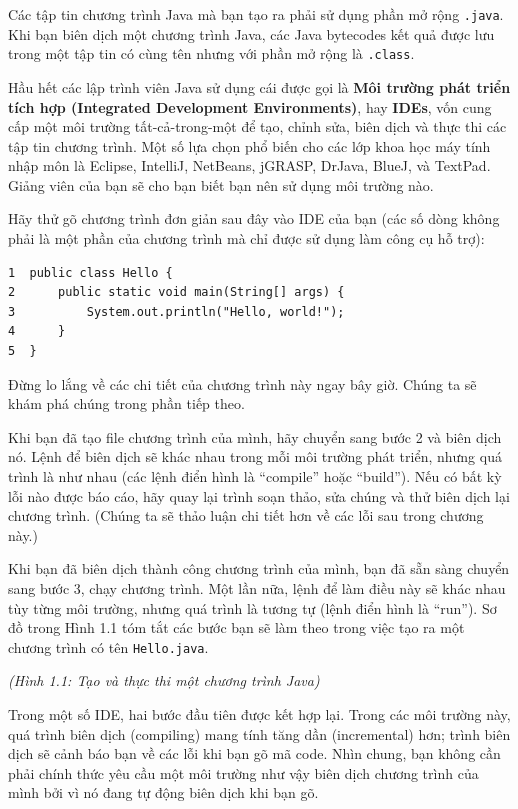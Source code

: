 Các tập tin chương trình Java mà bạn tạo ra phải sử dụng phần mở rộng
\texttt{.java}. Khi bạn biên dịch một chương trình Java, các Java
bytecodes kết quả được lưu trong một tập tin có cùng tên nhưng với phần
mở rộng là \texttt{.class}.

Hầu hết các lập trình viên Java sử dụng cái được gọi là \textbf{Môi
trường phát triển tích hợp (Integrated Development Environments)}, hay
\textbf{IDEs}, vốn cung cấp một môi trường tất-cả-trong-một để tạo,
chỉnh sửa, biên dịch và thực thi các tập tin chương trình. Một số lựa
chọn phổ biến cho các lớp khoa học máy tính nhập môn là Eclipse,
IntelliJ, NetBeans, jGRASP, DrJava, BlueJ, và TextPad. Giảng viên của
bạn sẽ cho bạn biết bạn nên sử dụng môi trường nào.

Hãy thử gõ chương trình đơn giản sau đây vào IDE của bạn (các số dòng
không phải là một phần của chương trình mà chỉ được sử dụng làm công cụ
hỗ trợ):

\begin{verbatim}
1  public class Hello {
2      public static void main(String[] args) {
3          System.out.println("Hello, world!");
4      }
5  }
\end{verbatim}

Đừng lo lắng về các chi tiết của chương trình này ngay bây giờ. Chúng ta
sẽ khám phá chúng trong phần tiếp theo.

Khi bạn đã tạo file chương trình của mình, hãy chuyển sang bước 2 và
biên dịch nó. Lệnh để biên dịch sẽ khác nhau trong mỗi môi trường phát
triển, nhưng quá trình là như nhau (các lệnh điển hình là ``compile''
hoặc ``build''). Nếu có bất kỳ lỗi nào được báo cáo, hãy quay lại trình
soạn thảo, sửa chúng và thử biên dịch lại chương trình. (Chúng ta sẽ
thảo luận chi tiết hơn về các lỗi sau trong chương này.)

Khi bạn đã biên dịch thành công chương trình của mình, bạn đã sẵn sàng
chuyển sang bước 3, chạy chương trình. Một lần nữa, lệnh để làm điều này
sẽ khác nhau tùy từng môi trường, nhưng quá trình là tương tự (lệnh điển
hình là ``run''). Sơ đồ trong Hình 1.1 tóm tắt các bước bạn sẽ làm theo
trong việc tạo ra một chương trình có tên \texttt{Hello.java}.

\emph{(Hình 1.1: Tạo và thực thi một chương trình Java)}

Trong một số IDE, hai bước đầu tiên được kết hợp lại. Trong các môi
trường này, quá trình biên dịch (compiling) mang tính tăng dần
(incremental) hơn; trình biên dịch sẽ cảnh báo bạn về các lỗi khi bạn gõ
mã code. Nhìn chung, bạn không cần phải chính thức yêu cầu một môi
trường như vậy biên dịch chương trình của mình bởi vì nó đang tự động
biên dịch khi bạn gõ.

